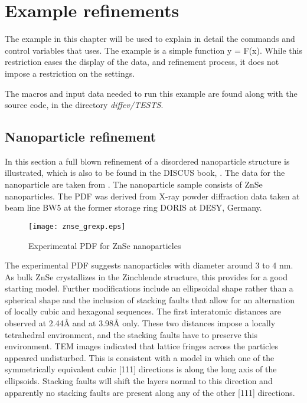 
\chapter{Example refinements \label{example}}

The example in this chapter will be used to explain in detail the 
commands and control variables that \Diffev uses. The example is a 
simple function y = F(x). While this restriction eases the display of the 
data, and refinement process, it does not impose a restriction on the
settings.

The macros and input data needed to run this example are found along
with the \Diffev source code, in the directory {\em diffev/TESTS}.

\section{Nanoparticle refinement}

In this section  a full blown refinement of a disordered nanoparticle 
structure is illustrated, which is also to be found in the DISCUS 
book, \cite{nedpro}. The data for the nanoparticle are taken from
\cite{neder2007}. The nanoparticle sample consists of ZnSe nanoparticles.
The PDF was derived from X-ray powder diffraction data taken at beam line 
BW5 at the former storage ring DORIS at DESY, Germany. 

\begin{figure}
   \texttt{[image: znse\_grexp.eps]}
   \caption{Experimental PDF for ZnSe nanoparticles}
   \label{fexa-znse-grexp}
\end{figure}

The experimental PDF suggests nanoparticles with diameter around 3 to 4 nm.
As bulk ZnSe crystallizes in the Zincblende structure, this provides for
a good starting model. Further modifications include an ellipsoidal shape
rather than a spherical shape and the inclusion of stacking faults that
allow for an alternation of locally cubic and hexagonal sequences. 
The first interatomic distances are observed at 2.44\AA{} and at
3.98\AA{} only. These two distances impose a locally tetrahedral environment,
and the stacking faults have to preserve this environment. TEM images
indicated that lattice fringes across the particles appeared undisturbed.
This is consistent with a model in which one of the symmetrically
equivalent cubic [111] directions is along the long axis of the ellipsoids.
Stacking faults will shift the layers normal to this direction and 
apparently no stacking faults are present along any of the other [111]
directions. 

